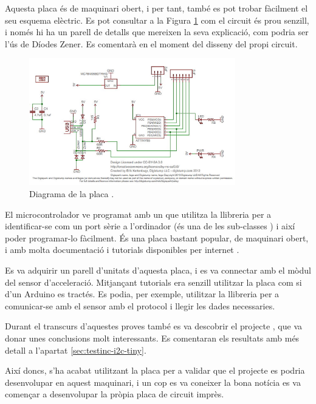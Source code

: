 Aquesta placa és de maquinari obert, i per tant, també es pot trobar fàcilment
el seu esquema elèctric. Es pot consultar a la Figura \ref{fig:digisparksch}
com el circuit és prou senzill, i només hi ha un parell de detalls que mereixen
la seva explicació, com podria ser l'ús de Díodes Zener. Es comentarà en el
moment del disseny del propi circuit.

\begin{figure}[ht]
    \centering
    \includegraphics[width=0.8\textwidth]{images/modules/digisparksch.jpg}
    \caption{Diagrama de la placa  \cite{Digispark}.}
    \label{fig:digisparksch}
\end{figure}

El microcontrolador ve programat amb un  que utilitza la
llibreria  per a identificar-se com un port sèrie a l'ordinador
(és una de les sub-classes ) i així poder programar-lo fàcilment.
És una placa bastant popular, de maquinari obert, i amb molta documentació i
tutorials disponibles per internet \cite{DigisparkBootloader}.

Es va adquirir un parell d'unitats d'aquesta placa, i es va connectar amb el
mòdul del sensor d'acceleració. Mitjançant tutorials era senzill utilitzar la
placa  com si d'un Arduino es tractés. Es podia, per exemple,
utilitzar la llibreria  per a comunicar-se amb el sensor amb el
protocol  i llegir les dades necessaries.

Durant el transcurs d'aquestes proves també es va descobrir el projecte
, que va donar unes conclusions molt interessants. Es
comentaran els resultats amb més detall a l'apartat \ref{sec:testinc-i2c-tiny}.

Així doncs, s'ha acabat utilitzant la placa  per a validar
que el projecte es podria desenvolupar en aquest maquinari, i un cop es va
coneixer la bona notícia es va començar a desenvolupar la pròpia placa de circuit
imprès.

